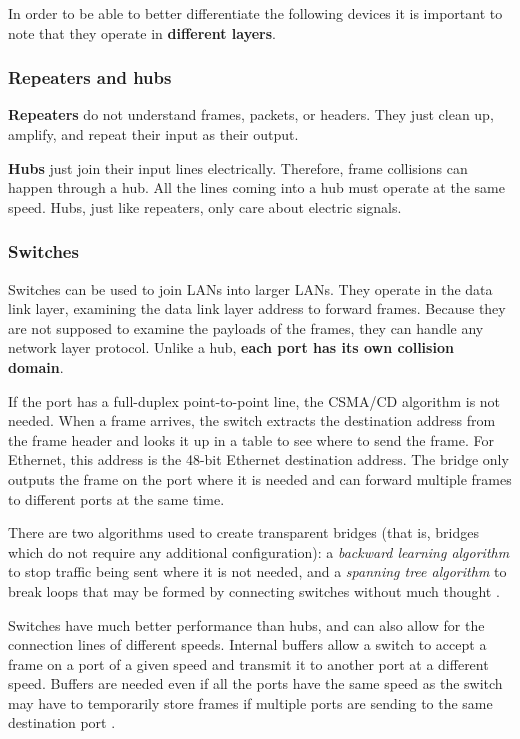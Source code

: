 \documentclass[12pt, oneside]{book}
\begin{document}
In order to be able to better differentiate the following devices it is important to note that they operate in \textbf{different layers}.

\subsubsection{Repeaters and hubs}

\textbf{Repeaters} do not understand frames, packets, or headers.
They just clean up, amplify, and repeat their input as their output.

\textbf{Hubs} just join their input lines electrically.
Therefore, frame collisions can happen through a hub.
All the lines coming into a hub must operate at the same speed.
Hubs, just like repeaters, only care about electric signals.

\subsubsection{Switches}

Switches can be used to join LANs into larger LANs.
They operate in the data link layer, examining the data link layer address to forward frames.
Because they are not supposed to examine the payloads of the frames, they can handle any network layer protocol.
Unlike a hub, \textbf{each port has its own collision domain}.

If the port has a full-duplex point-to-point line, the CSMA/CD algorithm is not needed.
When a frame arrives, the switch extracts the destination address from the frame header and looks it up in a table to see where to send the frame.
For Ethernet, this address is the 48-bit Ethernet destination address.
The bridge only outputs the frame on the port where it is needed and can forward multiple frames to different ports at the same time.

There are two algorithms used to create transparent bridges (that is, bridges which do not require any additional configuration): a \textit{backward learning algorithm} to stop traffic being sent where it is not needed, and a \textit{spanning tree algorithm} to break loops that may be formed by connecting switches without much thought \cite[p.~333]{computer-networks-tanenbaum-2012}.

Switches have much better performance than hubs, and can also allow for the connection lines of different speeds. Internal buffers allow a switch to accept a frame on a port of a given speed and transmit it to another port at a different speed. Buffers are needed even if all the ports have the same speed as the switch may have to temporarily store frames if multiple ports are sending to the same destination port \cite[p.~341]{computer-networks-tanenbaum-2012}.
\end{document}
